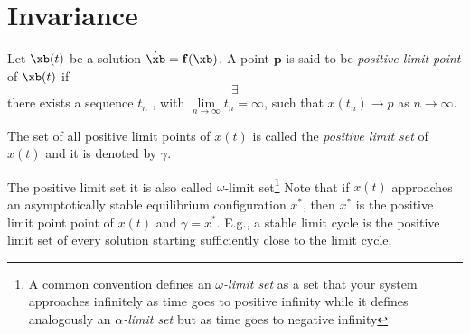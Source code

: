 \section{Invariance}
\begin{defn}
	Let $\xb(t)$ be a solution $\dot{\xb}=\mathbf{f}(\xb)$. A point $\mathbf{p}$ is said to be \textit{positive limit point} of $\xb(t)$ if
	\begin{equation}
	    \exists
	\end{equation}
	there exists a sequence $t_n$ , with $\lim\limits_{n\rightarrow\infty}t_n=\infty$, such that $x(t_n)\rightarrow p$ as $n\rightarrow\infty$.
\end{defn}
% 
\begin{defn}
	The set of all positive limit points of $x(t)$ is called the \textit{positive limit set} of $x(t)$ and it is denoted by $\gamma$.
\end{defn}
%
The positive limit set it is also called $\omega$-limit set\footnote{A common convention defines an $\omega$\textit{-limit set} as a set that your system approaches infinitely as time goes to positive infinity while it defines analogously an $\alpha$\textit{-limit set} but as time goes to negative infinity}
Note that if $x(t)$ approaches an asymptotically stable equilibrium configuration $x^*$, then $x^*$ is the positive limit point point of $x(t)$ and $\gamma=x^*$.
E.g., a stable limit cycle is the positive limit set of every solution starting sufficiently close to the limit cycle.
